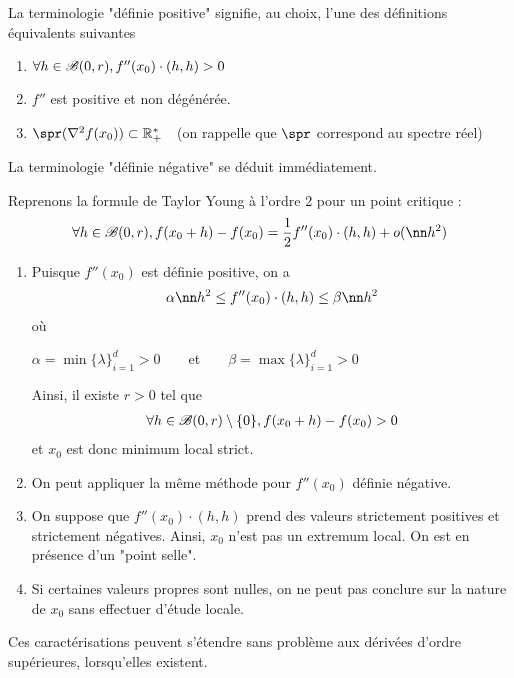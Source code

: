 \documentclass[french,a4paper,10pt]{article}
\begin{document}
	\begin{oc-remark}
		La terminologie "définie positive" signifie, au choix, l'une des définitions équivalents suivantes
			\begin{enumerate}[label=$(\roman*)$]
				\item $\forall h\in \mathscr{B}(0, r),f''(x_0)\cdot (h,h)>0$
				
				\item $f''$ est positive et non dégénérée.
				
				\item $\spr(\nabla^2f(x_0))\sub \bb R_+^*\quad$(on rappelle que $\spr$ correspond au spectre réel)
			\end{enumerate}
			
		La terminologie "définie négative" se déduit immédiatement.
		
	\end{oc-remark}
	\begin{myproof}
		Reprenons la formule de Taylor Young à l'ordre 2 pour un point critique :
			\[\begin{aligned}
				\forall h\in\scr B(0, r),f(x_0+h)-f(x_0)=\frac12f''(x_0)\cdot(h,h)+o(\nn h^2)
			\end{aligned}\]
		\begin{enumerate}[label=$(\roman*)$]
			\item Puisque $f''(x_0)$ est définie positive, on a
				\[\begin{aligned}
					\alpha\nn h^2\le f''(x_0)\cdot (h, h)\le \beta \nn h^2
				\end{aligned}\]
			où 
			\begin{center}
				$\alpha=\min\{\lambda\}_{i=1}^d>0\qquad$et$\qquad \beta=\max\{\lambda\}_{i=1}^d>0$
			\end{center}
			Ainsi, il existe $r>0$ tel que
				\[\begin{aligned}
					\forall h\in \mathscr{B}(0, r)\setminus\{0\},f(x_0+h)-f(x_0)>0
				\end{aligned}\]
			et $x_0$ est donc minimum local strict.
			
			\item On peut appliquer la même méthode pour $f''(x_0)$ définie négative.
			
			\item On suppose que $f''(x_0)\cdot(h,h)$ prend des valeurs strictement positives et strictement négatives. Ainsi, $x_0$ n'est pas un extremum local. On est en présence d'un "point selle".
			
			\item Si certaines valeurs propres sont nulles, on ne peut pas conclure sur la nature de $x_0$ sans effectuer d'étude locale.
		\end{enumerate}
		
	\end{myproof}
	\begin{oc-remark}
		Ces caractérisations peuvent s'étendre sans problème aux dérivées d'ordre supérieures, lorsqu'elles existent.
		
	\end{oc-remark}
	
\end{document}
